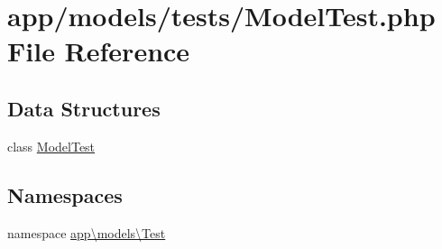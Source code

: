 \hypertarget{_model_test_8php}{\section{app/models/tests/\-Model\-Test.php File Reference}
\label{_model_test_8php}
}
\subsection*{Data Structures}
\begin{DoxyCompactItemize}
\item 
class \hyperlink{classapp_1_1models_1_1_test_1_1_model_test}{Model\-Test}
\end{DoxyCompactItemize}
\subsection*{Namespaces}
\begin{DoxyCompactItemize}
\item 
namespace \hyperlink{namespaceapp_1_1models_1_1_test}{app\textbackslash{}models\textbackslash{}\-Test}
\end{DoxyCompactItemize}

